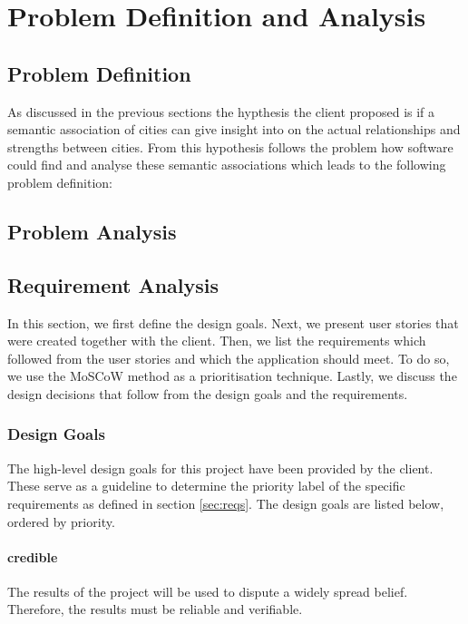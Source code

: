\section{Problem Definition and Analysis}\label{sec:problem-definition-analysis}
\subsection{Problem Definition}
As discussed in the previous sections the hypthesis the client proposed is if a semantic association of cities can give insight into on the actual relationships and strengths between cities. From this hypothesis follows the problem how software could find and analyse these semantic associations which leads to the following problem definition:\\
\texttt{}
\subsection{Problem Analysis}
\subsection{Requirement Analysis}
In this section, we first define the design goals. Next, we present user stories that were created together with the client. Then, we list the requirements which followed from the user stories and which the application should meet. To do so, we use the MoSCoW method\cite{clegg1994case} as a prioritisation technique. Lastly, we discuss the design decisions that follow from the design goals and the requirements.




\subsubsection{Design Goals} \label{sec:design-goals}
The high-level design goals for this project have been provided by the client. These serve as a guideline to determine the priority label of the specific requirements as defined in section \ref{sec:reqs}. The design goals are listed below, ordered by priority.

\paragraph{credible} The results of the project will be used to dispute a widely spread belief. Therefore, the results must be reliable and verifiable.
